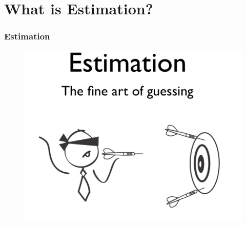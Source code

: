 \documentclass{beamer}
\begin{document}
\section{What is Estimation?}
\begin{frame}
\frametitle{Estimation}
\begin{figure}
\begin{center}
\includegraphics[width=0.75\linewidth]{Estimation-Cartoon.png}
\end{center}
\end{figure}
\end{frame}
\end{document}
